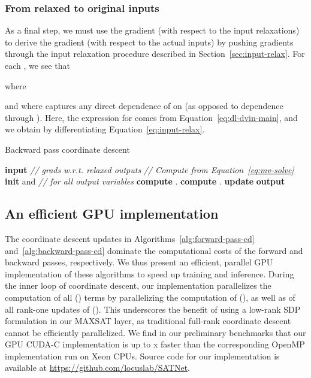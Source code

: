 \documentclass{article}
\begin{document}
	\subsubsection{From relaxed to original inputs}
	
	As a final step, we must use the gradient  (with respect to the input relaxations) to derive the gradient  (with respect to the actual inputs) by pushing gradients through the input relaxation procedure described in Section~\ref{sec:input-relax}.
	For each , we see that
	
	where
	
	and where  captures any direct dependence of  on  (as opposed to dependence through ).
	Here, the expression for  comes from Equation~\eqref{eq:dl-dvin-main}, and we obtain  by differentiating Equation~\eqref{eq:input-relax}.


	\begin{algorithm}[t]
		\begin{algorithmic}[1]
			\caption{Backward pass coordinate descent}
			\State \textbf{input}  \hspace{0.3em} \emph{// grads w.r.t. relaxed outputs}
\vspace{0.25em}
			\State \emph{// Compute 
 from Equation~\eqref{eq:mv-solve}}
\State \textbf{init}  and 
			\For{} \hspace{1em} \emph{// for all output variables}
			\State \textbf{compute} .
			\State \textbf{compute} .
\State \textbf{update} 
			\EndFor
			\EndWhile
			\State \textbf{output} 
			\label{alg:backward-pass-cd}
		\end{algorithmic}
	\end{algorithm}
	




	\subsection{An efficient GPU implementation}
	The coordinate descent updates in Algorithms~\ref{alg:forward-pass-cd} and~\ref{alg:backward-pass-cd} dominate the computational costs of the forward and backward passes, respectively.
	We thus present an efficient, parallel GPU implementation of these algorithms to speed up training and inference. 
	During the inner loop of coordinate descent, our implementation parallelizes the computation of all  () terms by parallelizing the computation of  (), as well as of all rank-one updates of  ().
	This 
underscores the benefit of using a low-rank SDP formulation in our MAXSAT layer, as traditional full-rank coordinate descent cannot be efficiently parallelized.
	We find in our preliminary benchmarks that our GPU CUDA-C implementation is up to x faster than the corresponding OpenMP implementation run on Xeon CPUs.
Source code for our implementation is available at \url{https://github.com/locuslab/SATNet}.
\end{document}
